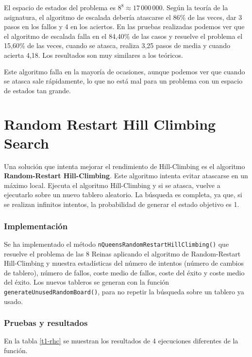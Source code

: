\documentclass[..main.tex]{subfiles}
\begin{document}
El espacio de estados del problema es $8^8 \approx 17\,000\,000$. Según la teoría de la asignatura, el algoritmo de escalada debería atascarse el 86\% de las veces, dar 3 pasos en los fallos y 4 en los aciertos. En las pruebas realizadas podemos ver que el algoritmo de escalada falla en el 84,40\% de las casos y resuelve el problema el 15,60\% de las veces, cuando se atasca, realiza 3,25 pasos de media y cuando acierta 4,18. Los resultados son muy similares a los teóricos. 

Este algoritmo falla en la mayoría de ocasiones, aunque podemos ver que cuando se atasca sale rápidamente, lo que no está mal para un problema con un espacio de estados tan grande.




\section{Random Restart Hill Climbing Search}
Una solución que intenta mejorar el rendimiento de Hill-Climbing es el algoritmo \textbf{Random-Restart Hill-Climbing}. Este algoritmo intenta evitar atascarse en un máximo local. Ejecuta el algoritmo Hill-Climbing y si se atasca, vuelve a ejecutarlo sobre un nuevo tablero aleatorio. La búsqueda es completa, ya que, si se realizan infinitos intentos, la probabilidad de generar el estado objetivo es 1.

\subsubsection{Implementación}
Se ha implementado el método \texttt{nQueensRandomRestartHillClimbing()} que resuelve el problema de las 8 Reinas aplicando el algoritmo  de Random-Restart Hill-Climbing y muestra estadísticas del número de intentos (número de cambios de tablero), número de fallos, coste medio de fallos, coste del éxito y coste medio del éxito.
Los nuevos tableros se generan con la función \texttt{generateUnusedRandomBoard()}, para no repetir la búsqueda sobre un tablero ya usado.

\subsubsection{Pruebas y resultados}
En la tabla \ref{t1-rhc} se muestran los resultados de 4 ejecuciones diferentes de la función.
\end{document}
